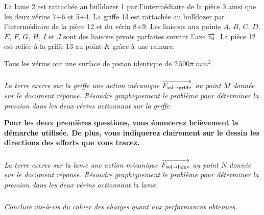 \documentclass[10pt]{article}
\begin{document}
La lame 2 est rattachée au bulldozer 1 par l'intermédiaire de la pièce 3 ainsi que les deux vérins 7+6 et 5+4. La griffe 13 est rattachée au bulldozer par l'intermédiaire de la pièce 12 et du vérin 8+9. Les liaisons aux points $A$, $B$, $C$, $D$, $E$, $F$, $G$, $H$, $I$ et $J$ sont des liaisons pivots parfaites suivant l'axe $\overrightarrow{z_0}$. La pièce 12 est reliée à la griffe 13 au point $K$ grâce à une rainure. 

Tous les vérins ont une surface de piston identique de $2\, 500\pi\; mm^2$.

\subparagraph{}
\textit{La terre exerce sur la griffe une action mécanique $\overrightarrow{F_{\text{sol}\rightarrow \text{griffe}}}$ au point $M$ donnée sur le document réponse. Résoudre graphiquement le problème pour déterminer la pression dans les deux vérins actionnant sur la griffe.}

\textbf{Pour les deux premières questions, vous énoncerez brièvement la démarche utilisée. De plus, vous indiquerez clairement sur le dessin les directions des efforts que vous tracez.}

\subparagraph{}
\textit{La terre exerce sur la lame une action mécanique $\overrightarrow{F_{\text{sol}\rightarrow \text{lame}}}$ au point $N$ donnée sur le document réponse. Résoudre graphiquement le problème pour déterminer la pression dans les deux vérins actionnant la lame.}


\subparagraph{}
\textit{Conclure vis-à-vis du cahier des charges quant aux performances obtenues.}


\newpage 

\begin{center}
\end{center}

\newpage 

\begin{center}
\end{center}
\end{document}
